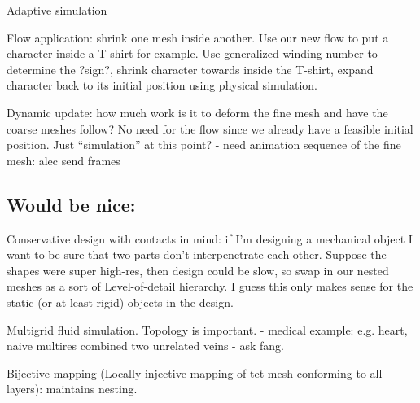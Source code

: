 Adaptive simulation \cite{Debunne:2001:DRD}

Flow application: shrink one mesh inside another. Use our new flow to put a 
character inside a T-shirt for example. Use generalized winding number to 
determine the ?sign?, shrink character towards inside the T-shirt, 
expand character back to its initial position using physical simulation. 

Dynamic update: how much work is it to deform the fine mesh and have the coarse
meshes follow? No need for the flow since we already have a feasible initial
position. Just ``simulation'' at this point?
  - need animation sequence of the fine mesh: alec send frames

\subsection{Would be nice:}

Conservative design with contacts in mind: if I'm designing a mechanical object
I want to be sure that two parts don't interpenetrate each other. Suppose the
shapes were super high-res, then design could be slow, so swap in our nested
meshes as a sort of Level-of-detail hierarchy. I guess this only makes sense
for the static (or at least rigid) objects in the design.

Multigrid fluid simulation. Topology is important.
  - medical example: e.g. heart, naive multires combined two unrelated veins
  - ask fang.

Bijective mapping (Locally injective mapping of tet mesh conforming to all
layers): maintains nesting.
